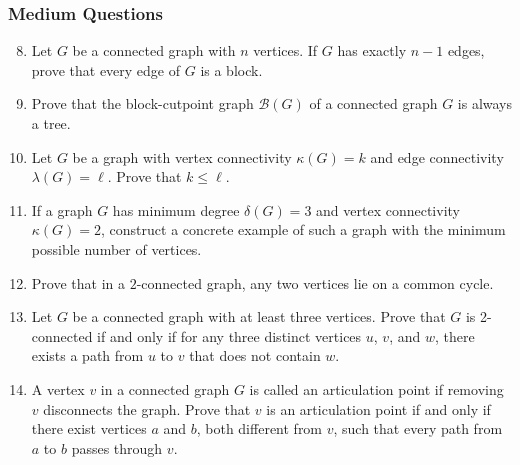 \documentclass{article}
\theoremstyle{definition}
\begin{document}
\subsubsection{Medium Questions}
\begin{enumerate}\setcounter{enumi}{7}
\item Let $G$ be a connected graph with $n$ vertices. If $G$ has exactly $n-1$ edges, prove that every edge of $G$ is a block.

\item Prove that the block-cutpoint graph $\mathcal{B}(G)$ of a connected graph $G$ is always a tree.

\item Let $G$ be a graph with vertex connectivity $\kappa(G) = k$ and edge connectivity $\lambda(G) = \ell$. Prove that $k \leq \ell$.

\item If a graph $G$ has minimum degree $\delta(G) = 3$ and vertex connectivity $\kappa(G) = 2$, construct a concrete example of such a graph with the minimum possible number of vertices.

\item Prove that in a $2$-connected graph, any two vertices lie on a common cycle.

\item Let $G$ be a connected graph with at least three vertices. Prove that $G$ is 2-connected if and only if for any three distinct vertices $u$, $v$, and $w$, there exists a path from $u$ to $v$ that does not contain $w$.

\item A vertex $v$ in a connected graph $G$ is called an articulation point if removing $v$ disconnects the graph. Prove that $v$ is an articulation point if and only if there exist vertices $a$ and $b$, both different from $v$, such that every path from $a$ to $b$ passes through $v$.
\end{enumerate}
\end{document}
